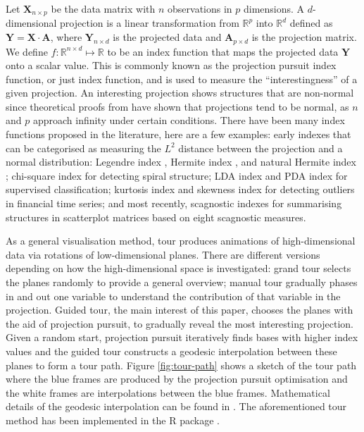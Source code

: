 Let \(\mathbf{X}_{n \times p}\) be the data matrix with \(n\)
observations in \(p\) dimensions. A \(d\)-dimensional projection is a
linear transformation from \(\mathbb{R}^p\) into \(\mathbb{R}^d\)
defined as \(\mathbf{Y} = \mathbf{X} \cdot \mathbf{A}\), where
\(\mathbf{Y}_{n \times d}\) is the projected data and
\(\mathbf{A}_{p\times d}\) is the projection matrix. We define
\(f: \mathbb{R}^{n \times d} \mapsto \mathbb{R}\) to be an index
function that maps the projected data \(\mathbf{Y}\) onto a scalar
value. This is commonly known as the projection pursuit index function,
or just index function, and is used to measure the ``interestingness''
of a given projection. An interesting projection shows structures that
are non-normal since theoretical proofs from
\citet{diaconis1984asymptotics} have shown that projections tend to be
normal, as \(n\) and \(p\) approach infinity under certain conditions.
There have been many index functions proposed in the literature, here
are a few examples: early indexes that can be categorised as measuring
the \(L^2\) distance between the projection and a normal distribution:
Legendre index \citep{friedman1974projection}, Hermite index
\citep{hall1989polynomial}, and natural Hermite index
\citep{cook1993projection}; chi-square index \citep{posse1995projection}
for detecting spiral structure; LDA index \citep{lee2005projection} and
PDA \citep{lee2010projection} index for supervised classification;
kurtosis index \citep{Loperfido2020} and skewness index
\citep{Loperfido2018} for detecting outliers in financial time series;
and most recently, scagnostic indexes \citep{laa2020using} for
summarising structures in scatterplot matrices based on eight scagnostic
measures.

As a general visualisation method, tour produces animations of
high-dimensional data via rotations of low-dimensional planes. There are
different versions depending on how the high-dimensional space is
investigated: grand tour \citep{cook2008grand} selects the planes
randomly to provide a general overview; manual tour
\citep{cook1997manual} gradually phases in and out one variable to
understand the contribution of that variable in the projection. Guided
tour, the main interest of this paper, chooses the planes with the aid
of projection pursuit, to gradually reveal the most interesting
projection. Given a random start, projection pursuit iteratively finds
bases with higher index values and the guided tour constructs a geodesic
interpolation between these planes to form a tour path. Figure
\ref{fig:tour-path} shows a sketch of the tour path where the blue
frames are produced by the projection pursuit optimisation and the white
frames are interpolations between the blue frames. Mathematical details
of the geodesic interpolation can be found in
\citet{buja2005computational}. The aforementioned tour method has been
implemented in the R package  \citep{tourr}.

